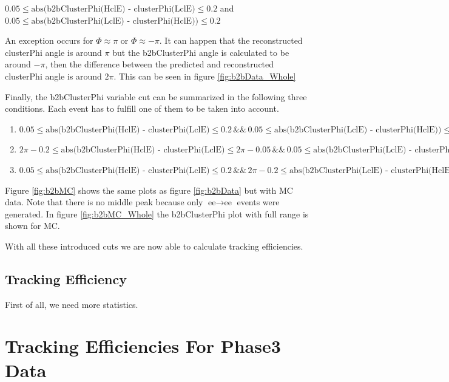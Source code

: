 \documentclass[a4paper,11pt,twosided,final,german,openbib,pdftex,listof=totoc,bibliography=totoc]{scrbook}
\begin{document}
 $0.05 \leq \textrm{abs(b2bClusterPhi(HclE) - clusterPhi(LclE)} \leq 0.2 $ and  $0.05 \leq \textrm{abs(b2bClusterPhi(LclE) - clusterPhi(HclE))} \leq 0.2$

An exception occurs for $\Phi \approx \pi$ or $\Phi \approx -\pi$. It can happen that the reconstructed clusterPhi angle is around $\pi$ but the b2bClusterPhi angle is calculated to be around $-\pi$, then the difference between the predicted and reconstructed clusterPhi angle is around $2\pi$. This can be seen in figure \ref{fig:b2bData_Whole}

Finally, the b2bClusterPhi variable cut can be summarized in the following three conditions. Each event has to fulfill one of them to be taken into account.

\begin{enumerate}
	\item $0.05 \leq \textrm{abs(b2bClusterPhi(HclE) - clusterPhi(LclE)} \leq 0.2 \, \&\& \, 0.05 \leq \textrm{abs(b2bClusterPhi(LclE) - clusterPhi(HclE))} \leq 0.2$
	\item $2\pi - 0.2 \leq \textrm{abs(b2bClusterPhi(HclE) - clusterPhi(LclE)} \leq 2\pi - 0.05 \, \&\& \, 0.05 \leq \textrm{abs(b2bClusterPhi(LclE) - clusterPhi(HclE))} \leq 0.2$
	\item $0.05 \leq \textrm{abs(b2bClusterPhi(HclE) - clusterPhi(LclE)} \leq 0.2 \, \&\& \, 2\pi - 0.2 \leq \textrm{abs(b2bClusterPhi(LclE) - clusterPhi(HclE))} \leq 2\pi - 0.05$
\end{enumerate}





Figure \ref{fig:b2bMC} shows the same plots as figure \ref{fig:b2bData} but with MC data. Note that there is no middle peak because only $\textrm{ee} \rightarrow \textrm{ee}$ events were generated. In figure \ref{fig:b2bMC_Whole} the b2bClusterPhi plot with full range is shown for MC.

With all these introduced cuts we are now able to calculate tracking efficiencies.


\section{Tracking Efficiency}
\label{sec:TrackingEfficiency}

First of all, we need more statistics.





\chapter{Tracking Efficiencies For Phase3 Data}
\end{document}
